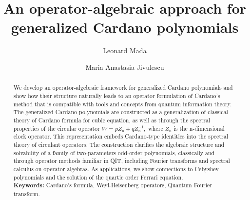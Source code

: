 \documentclass[11pt,reqno]{amsart}
\begin{document}
\title[  An operator-algebraic approach for generalized Cardano polynomials]{  An operator-algebraic approach for generalized Cardano polynomials}

\author{Leonard Mada}
\address{Department of Immunology, Victor Babe\c{s} University of Medicine, Eftimie Murgu Square 2, 300041, Timi\c{s}oara, Romania.}


\author{Maria Anastasia Jivulescu}
\address{Department of Mathematics, Politehnica University of Timi\c soara, Victoriei Square 2, 300006 Timi\c soara, Romania.}







\begin{abstract}

We develop an operator‑algebraic framework for generalized Cardano polynomials and show how their structure naturally leads to an operator formulation of Cardano’s method that is compatible with tools and concepts from quantum information theory. The generalized Cardano polynomials are constructed as a generalization of classical theory of Cardano formula for cubic equation, as well as through the spectral properties of the circular operator $W=pZ_n+qZ_n^{-1},$ where $Z_n$ is the n-dimensional clock operator. This representation embeds Cardano‑type identities into the spectral theory of circulant operators.
The construction clarifies the algebraic structure and solvability of a family of two-parameters  odd-order polynomials,   classically and through operator methods familiar in QIT, including Fourier transforms and spectral calculus on operator algebras. As applications, we show connections to Cebyshev polynomials and the solution of the quartic order Ferrari equation.
\\\textbf{Keywords:} Cardano's formula, Weyl-Heisenberg operators, Quantum Fourier transform.
\end{abstract}


\maketitle 

\end{document}
